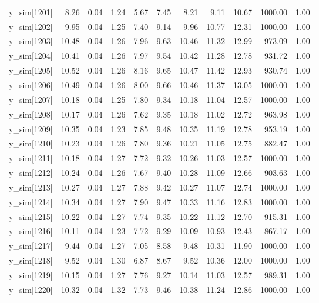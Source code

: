 \begin{table}[ht]
\begin{tabular}{rrrrrrrrrrr}
  y\_sim[1201] & 8.26 & 0.04 & 1.24 & 5.67 & 7.45 & 8.21 & 9.11 & 10.67 & 1000.00 & 1.00 \\ 
  y\_sim[1202] & 9.95 & 0.04 & 1.25 & 7.40 & 9.14 & 9.96 & 10.77 & 12.31 & 1000.00 & 1.00 \\ 
  y\_sim[1203] & 10.48 & 0.04 & 1.26 & 7.96 & 9.63 & 10.46 & 11.32 & 12.99 & 973.09 & 1.00 \\ 
  y\_sim[1204] & 10.41 & 0.04 & 1.26 & 7.97 & 9.54 & 10.42 & 11.28 & 12.78 & 931.72 & 1.00 \\ 
  y\_sim[1205] & 10.52 & 0.04 & 1.26 & 8.16 & 9.65 & 10.47 & 11.42 & 12.93 & 930.74 & 1.00 \\ 
  y\_sim[1206] & 10.49 & 0.04 & 1.26 & 8.00 & 9.66 & 10.46 & 11.37 & 13.05 & 1000.00 & 1.00 \\ 
  y\_sim[1207] & 10.18 & 0.04 & 1.25 & 7.80 & 9.34 & 10.18 & 11.04 & 12.57 & 1000.00 & 1.00 \\ 
  y\_sim[1208] & 10.17 & 0.04 & 1.26 & 7.62 & 9.35 & 10.18 & 11.02 & 12.72 & 963.98 & 1.00 \\ 
  y\_sim[1209] & 10.35 & 0.04 & 1.23 & 7.85 & 9.48 & 10.35 & 11.19 & 12.78 & 953.19 & 1.00 \\ 
  y\_sim[1210] & 10.23 & 0.04 & 1.26 & 7.80 & 9.36 & 10.21 & 11.05 & 12.75 & 882.47 & 1.00 \\ 
  y\_sim[1211] & 10.18 & 0.04 & 1.27 & 7.72 & 9.32 & 10.26 & 11.03 & 12.57 & 1000.00 & 1.00 \\ 
  y\_sim[1212] & 10.24 & 0.04 & 1.26 & 7.67 & 9.40 & 10.28 & 11.09 & 12.66 & 903.63 & 1.00 \\ 
  y\_sim[1213] & 10.27 & 0.04 & 1.27 & 7.88 & 9.42 & 10.27 & 11.07 & 12.74 & 1000.00 & 1.00 \\ 
  y\_sim[1214] & 10.34 & 0.04 & 1.27 & 7.90 & 9.47 & 10.33 & 11.16 & 12.83 & 1000.00 & 1.00 \\ 
  y\_sim[1215] & 10.22 & 0.04 & 1.27 & 7.74 & 9.35 & 10.22 & 11.12 & 12.70 & 915.31 & 1.00 \\ 
  y\_sim[1216] & 10.11 & 0.04 & 1.23 & 7.72 & 9.29 & 10.09 & 10.93 & 12.43 & 867.17 & 1.00 \\ 
  y\_sim[1217] & 9.44 & 0.04 & 1.27 & 7.05 & 8.58 & 9.48 & 10.31 & 11.90 & 1000.00 & 1.00 \\ 
  y\_sim[1218] & 9.52 & 0.04 & 1.30 & 6.87 & 8.67 & 9.52 & 10.36 & 12.00 & 1000.00 & 1.00 \\ 
  y\_sim[1219] & 10.15 & 0.04 & 1.27 & 7.76 & 9.27 & 10.14 & 11.03 & 12.57 & 989.31 & 1.00 \\ 
  y\_sim[1220] & 10.32 & 0.04 & 1.32 & 7.73 & 9.46 & 10.38 & 11.24 & 12.86 & 1000.00 & 1.00 \\ 

\end{tabular}
\end{table}
